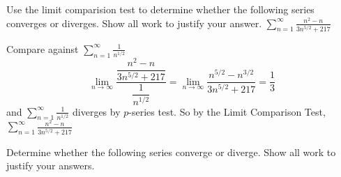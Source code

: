 \documentclass[12pt,answers]{exam}
\begin{document}
\begin{questions}
\question[7]
Use the limit comparision test to determine whether the following series converges or diverges. Show all work to justify your answer.
$\displaystyle \sum_{n=1}^{\infty} \frac{n^2-n}{3n^{5/2} + 217}$
\begin{solution}
    Compare against $\displaystyle \sum_{n=1}^\infty \frac{1}{n^{1/2}}$
    \[
        \lim_{n\to\infty} \frac{\dfrac{n^2-n}{3n^{5/2} + 217}}{\dfrac{1}{n^{1/2}}}
        = 
        \lim_{n\to\infty} \frac{n^{5/2}-n^{3/2}}{3n^{5/2} + 217} = \frac 13
    \]
    and $\displaystyle \sum_{n=1}^\infty \frac{1}{n^{1/2}}$ diverges by $p$-series test. 
    So by the Limit Comparison Test, \\
$\displaystyle \sum_{n=1}^{\infty} \frac{n^2-n}{3n^{5/2} + 217}$ 
\end{solution}

\newpage
\question
Determine whether the following series converge or diverge. Show all work to justify your answers.


\end{questions}
\end{document}
